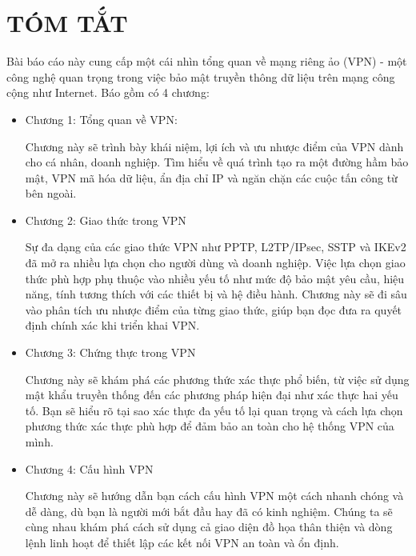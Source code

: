 \documentclass[13pt]{report}
\begin{document}
    \section*{\centering\fontsize{18pt}{20pt}\selectfont TÓM TẮT}
    Bài báo cáo này cung cấp một cái nhìn tổng quan về mạng riêng ảo (VPN) - một công nghệ quan trọng trong việc bảo mật truyền thông dữ liệu trên mạng công cộng như Internet. Báo gồm có 4 chương:
    \begin{itemize}
        \item Chương 1: Tổng quan về VPN:

        Chương này sẽ trình bày khái niệm, lợi ích và ưu nhược điểm của VPN dành cho cá nhân, doanh nghiệp. Tìm hiểu về quá trình tạo ra một đường hầm bảo mật, VPN mã hóa dữ liệu, ẩn địa chỉ IP và ngăn chặn các cuộc tấn công từ bên ngoài. 
        \item Chương 2: Giao thức trong VPN

        Sự đa dạng của các giao thức VPN như PPTP, L2TP/IPsec, SSTP và IKEv2 đã mở ra nhiều lựa chọn cho người dùng và doanh nghiệp. Việc lựa chọn giao thức phù hợp phụ thuộc vào nhiều yếu tố như mức độ bảo mật yêu cầu, hiệu năng, tính tương thích với các thiết bị và hệ điều hành. Chương này sẽ đi sâu vào phân tích ưu nhược điểm của từng giao thức, giúp bạn đọc đưa ra quyết định chính xác khi triển khai VPN.
         \item Chương 3: Chứng thực trong VPN

         Chương này sẽ khám phá các phương thức xác thực phổ biến, từ việc sử dụng mật khẩu truyền thống đến các phương pháp hiện đại như xác thực hai yếu tố. Bạn sẽ hiểu rõ tại sao xác thực đa yếu tố lại quan trọng và cách lựa chọn phương thức xác thực phù hợp để đảm bảo an toàn cho hệ thống VPN của mình.
         \item Chương 4: Cấu hình VPN

         Chương này sẽ hướng dẫn bạn cách cấu hình VPN một cách nhanh chóng và dễ dàng, dù bạn là người mới bắt đầu hay đã có kinh nghiệm. Chúng ta sẽ cùng nhau khám phá cách sử dụng cả giao diện đồ họa thân thiện và dòng lệnh linh hoạt để thiết lập các kết nối VPN an toàn và ổn định.
    \end{itemize}
    \newpage
    \begin{center}
        \tableofcontents
        \newpage
        \listoffigures %
    \end{center}

    
    \newpage
    
  
\end{document}
